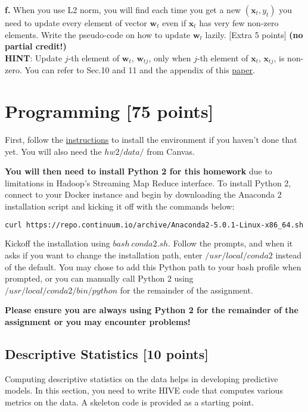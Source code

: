 \documentclass[12pt]{article}
\begin{document}
\textbf{f.} When you use L2 norm, you will find each time you get a new $(\mathbf{x}_t, y_t)$ you need to update every element of vector $\mathbf{w}_t$ even if $\mathbf{x}_t$ has very few non-zero elements. Write the pseudo-code on how to update $\mathbf{w}_t$ lazily. [Extra 5 points] \textbf{(no partial credit!)} \\

\textbf{HINT}: Update $j$-th element of $\mathbf{w}_{t}$, $\mathbf{w}_{tj}$, only when $j$-th element of $\mathbf{x}_{t}$, $\mathbf{x}_{tj}$, is non-zero. You can refer to Sec.10 and 11 and the appendix of this \href{http://lingpipe.files.wordpress.com/2008/04/lazysgdregression.pdf}{paper}. 

\section{Programming [75 points]}
First, follow the \href{http://www.sunlab.org/teaching/cse6250/spring2018/lab/environment/}{instructions} to install the environment if you haven't done that yet. You will also need the $hw2/data/$ from Canvas. 

\textbf{You will then need to install Python 2 for this homework} due to limitations in Hadoop's Streaming Map Reduce interface. To install Python 2, connect to your Docker instance and begin by downloading the Anaconda 2 installation script and kicking it off with the commands below: \\

\begin{lstlisting}[frame=single,language=bash,basicstyle=\tiny]
curl https://repo.continuum.io/archive/Anaconda2-5.0.1-Linux-x86_64.sh > conda2.sh
\end{lstlisting}


Kickoff the installation using $bash\ conda2.sh$. Follow the prompts, and when it asks if you want to change the installation path, enter $/usr/local/conda2$ instead of the default. You may chose to add this Python path to your bash profile when prompted, or you can manually call Python 2 using $/usr/local/conda2/bin/python$ for the remainder of the assignment.


\textbf{Please ensure you are always using Python 2 for the remainder of the assignment or you may encounter problems!}


\subsection{Descriptive Statistics [10 points]}
Computing descriptive statistics on the data helps in developing predictive models. In this section, you need to write HIVE code that computes various metrics on the data. A skeleton code is provided as a starting point. \\
\end{document}
